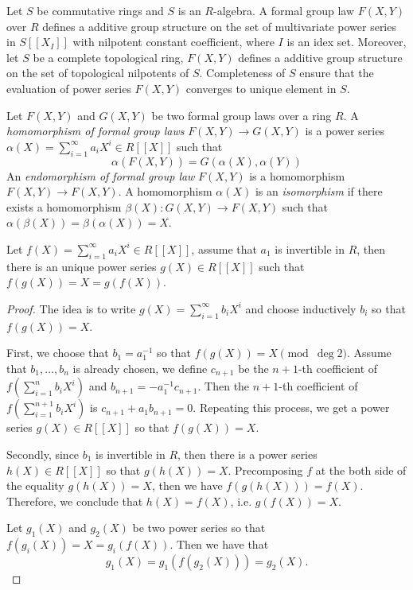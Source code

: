 \begin{remark}
    Let $S$ be commutative rings and $S$ is an $R$-algebra.
    A formal group law $F(X,Y)$ over $R$ defines a additive group structure on the set of
    multivariate power series in $S[\![X_I]\!]$ with nilpotent constant coefficient,
    where $I$ is an idex set.
    Moreover, let $S$ be a complete topological ring, $F(X,Y)$ defines a additive group
    structure on the set of topological nilpotents of $S$. Completeness of $S$ ensure that the
    evaluation of power series $F(X,Y)$ converges to unique element in $S$.

\end{remark}

\begin{definition}
    Let $F(X,Y)$ and $G(X,Y)$ be two formal group laws over a ring $R$.
    A \emph{homomorphism of formal group laws}
    $F(X,Y) \to G(X,Y)$ is a power series $\alpha (X) = \sum_{i=1}^{\infty}a_i X ^ i \in R[\![X]\!]$ such that
    \begin{equation*}
        \alpha (F(X,Y))= G(\alpha(X), \alpha(Y))
    \end{equation*}
    An \emph{endomorphism of formal group law} $F(X,Y)$ is a homomorphism $F(X,Y) \to F(X,Y)$.
    A homomorphism $\alpha(X)$ is an \emph{isomorphism} if there exists a homomorphism
    $\beta(X) : G(X,Y) \to F(X,Y)$ such that $\alpha (\beta(X)) = \beta (\alpha (X))= X$.
    \label{defn: hom of formal group law}
\end{definition}

\begin{lemma}
    Let $f(X) = \sum_{i=1}^{\infty} a_i X ^ i \in R[\![X]\!]$, assume that $a_1$ is invertible in
    $R$, then there is an
    unique power series $g(X) \in R[\![X]\!]$ such that $f(g(X)) = X = g(f(X))$.
    \label{lem: substInv}
\end{lemma}

\begin{proof}
    The idea is to write $g(X) = \sum_{i=1}^{\infty} b_i X ^ i$ and choose inductively $b_i$
    so that $f(g(X))= X$.

    First, we choose that $b_1 = a_1 ^{-1}$ so that $f(g(X)) = X \pmod{\deg 2}$. Assume that
    $b_1, \ldots, b_n$ is already chosen, we define $c_{n+1}$ be the $n+1$-th coefficient of
    $f(\sum_{i=1}^{n}b_i X ^ i)$ and $b_{n+1} = - a_1^{-1} c_{n+1}$. Then the $n+1$-th coefficient
    of $f(\sum_{i=1}^{n+1} b_i X ^ i)$ is $c_{n+1} + a_1 b_{n+1} = 0$. Repeating this process,
    we get a power series $g(X) \in R[\![X]\!]$ so that $f(g(X)) = X$.

    Secondly, since $b_1$ is invertible in $R$, then there is a power series $h(X) \in R[\![X]\!]$
    so that $g(h(X)) = X$. Precomposing $f$ at the both side of the equality $g(h(X)) = X$, then
    we have $f(g(h(X))) = f(X)$. Therefore, we conclude that $h(X) = f(X)$, i.e.
    $g(f(X)) = X$.

    Let $g_1(X)$ and $g_2(X)$ be two power series so that
    $f(g_i(X)) = X = g_i(f(X))$. Then we have that
    \[g_1(X) = g_1(f(g_2(X))) = g_2(X). \]
\end{proof}

